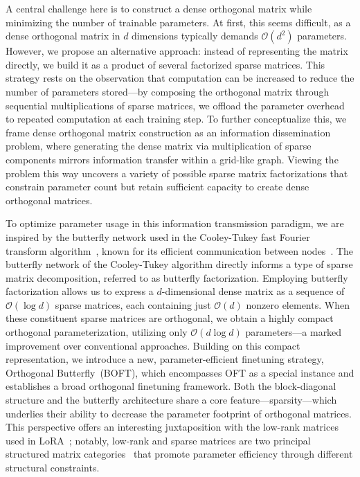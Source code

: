 A central challenge here is to construct a dense orthogonal matrix while minimizing the number of trainable parameters. At first, this seems difficult, as a dense orthogonal matrix in $d$ dimensions typically demands $\mathcal{O}(d^2)$ parameters. However, we propose an alternative approach: instead of representing the matrix directly, we build it as a product of several factorized sparse matrices. This strategy rests on the observation that computation can be increased to reduce the number of parameters stored—by composing the orthogonal matrix through sequential multiplications of sparse matrices, we offload the parameter overhead to repeated computation at each training step. To further conceptualize this, we frame dense orthogonal matrix construction as an information dissemination problem, where generating the dense matrix via multiplication of sparse components mirrors information transfer within a grid-like graph. Viewing the problem this way uncovers a variety of possible sparse matrix factorizations that constrain parameter count but retain sufficient capacity to create dense orthogonal matrices.

To optimize parameter usage in this information transmission paradigm, we are inspired by the butterfly network used in the Cooley-Tukey fast Fourier transform algorithm~\cite{cooley1965algorithm}, known for its efficient communication between nodes~\cite{klasing1994broadcasting}. The butterfly network of the Cooley-Tukey algorithm directly informs a type of sparse matrix decomposition, referred to as butterfly factorization. Employing butterfly factorization allows us to express a $d$-dimensional dense matrix as a sequence of $\mathcal{O}(\log d)$ sparse matrices, each containing just $\mathcal{O}(d)$ nonzero elements. When these constituent sparse matrices are orthogonal, we obtain a highly compact orthogonal parameterization, utilizing only $\mathcal{O}(d\log d)$ parameters—a marked improvement over conventional approaches. Building on this compact representation, we introduce a new, parameter-efficient finetuning strategy, Orthogonal Butterfly~(BOFT), which encompasses OFT as a special instance and establishes a broad orthogonal finetuning framework. Both the block-diagonal structure and the butterfly architecture share a core feature—sparsity—which underlies their ability to decrease the parameter footprint of orthogonal matrices. This perspective offers an interesting juxtaposition with the low-rank matrices used in LoRA~\cite{hulora2022}; notably, low-rank and sparse matrices are two principal structured matrix categories~\cite{candes2011robust} that promote parameter efficiency through different structural constraints.

